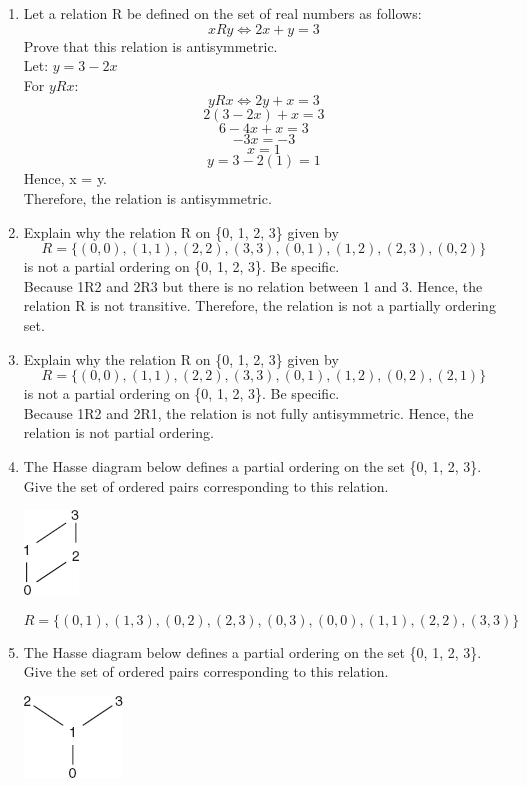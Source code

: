 \documentclass[12pt]{article}
\begin{document}
\begin{enumerate}
  \item Let a relation R be defined on the set of real numbers as follows:
  \[xRy \Leftrightarrow 2x + y = 3\]
  Prove that this relation is antisymmetric.\\
  Let: $y = 3 - 2x$\\
  For $yRx$:
  \[yRx \Leftrightarrow 2y + x = 3\]
  \[2(3-2x) + x = 3\]
  \[6-4x + x = 3\]
  \[-3x = -3\]
  \[x = 1\]
  \[y = 3 - 2(1) = 1\]
  Hence, x = y. \\
  Therefore, the relation is antisymmetric.
  \item Explain why the relation R on \{0, 1, 2, 3\} given by
  \[R = \{(0,0),(1,1),(2,2),(3,3),(0,1),(1,2),(2,3),(0,2)\}\]
  is not a partial ordering on \{0, 1, 2, 3\}. Be specific.\\
  Because 1R2 and 2R3 but there is no relation between 1 and 3. Hence, the relation R is not transitive. Therefore, the relation is not a partially ordering set.
  \item Explain why the relation R on \{0, 1, 2, 3\} given by
  \[R = \{(0,0),(1,1),(2,2),(3,3),(0,1),(1,2),(0,2),(2,1)\}\]
  is not a partial ordering on \{0, 1, 2, 3\}. Be specific.\\
  Because 1R2 and 2R1, the relation is not fully antisymmetric. Hence, the relation is not partial ordering.
  \item The Hasse diagram below defines a partial ordering on the set \{0, 1, 2, 3\}. Give the set of ordered pairs corresponding to this relation.
  \begin{center}
    \includegraphics[scale=0.8]{img/img-0.png}
  \end{center}
  \[R = \{(0,1),(1,3),(0,2),(2,3),(0,3),(0,0),(1,1),(2,2),(3,3)\}\]
  \item The Hasse diagram below defines a partial ordering on the set \{0, 1, 2, 3\}. Give the set of ordered pairs corresponding to this relation.
  \begin{center}
    \includegraphics[scale=0.8]{img/img-1.png}
  \end{center}

\end{enumerate}
\end{document}
